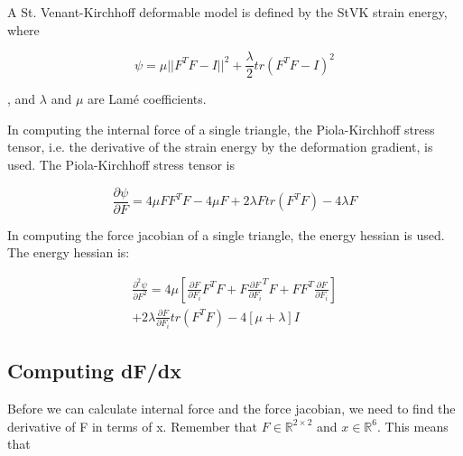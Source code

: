 \documentclass[twocolumn,10pt]{asme2ej}
\begin{document}
A St. Venant-Kirchhoff deformable model is defined by the StVK strain energy, where

\begin{equation}
\psi = \mu ||F^TF - I||^2 + \frac{\lambda}{2}tr(F^TF - I)^2
\label{eq_stvk}
\end{equation}

, and $\lambda$ and $\mu$ are Lamé coefficients.

In computing the internal force of a single triangle, the Piola-Kirchhoff stress tensor, i.e. the derivative of the strain energy by the deformation gradient, is used. The Piola-Kirchhoff stress tensor is

\begin{equation}
\frac{\partial \psi}{\partial F} = 4\mu FF^TF - 4\mu F + 2\lambda Ftr(F^TF) -4\lambda F
\label{eq_pk1}
\end{equation}

In computing the force jacobian of a single triangle, the energy hessian is used. The energy hessian is:

\begin{equation}
  \begin{split}
\frac{\partial^2 \psi}{\partial F^2} = 4\mu [\frac{\partial F}{\partial F_i}F^TF + F\frac{\partial F}{\partial F_i}^TF + FF^T\frac{\partial F}{\partial F_i}] \\ + 2\lambda \frac{\partial F}{\partial F_i}tr(F^TF) - 4[\mu + \lambda]I
  \end{split}
\label{eq_dpdf}
\end{equation}

\subsection{Computing dF/dx}

Before we can calculate internal force and the force jacobian, we need to find the derivative of F in terms of x. Remember that $F \in \mathbb{R}^{2 \times 2}$ and $x \in \mathbb{R}^6$. This means that
\end{document}
